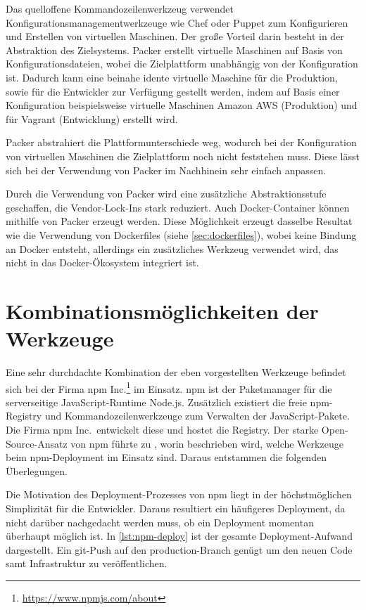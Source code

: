 Das quelloffene Kommandozeilenwerkzeug verwendet Konfigurationsmanagementwerkzeuge wie Chef oder Puppet zum Konfigurieren und Erstellen von virtuellen Maschinen.
Der große Vorteil darin besteht in der Abstraktion des Zielsystems.
Packer erstellt virtuelle Maschinen auf Basis von Konfigurationsdateien, wobei die Zielplattform unabhängig von der Konfiguration ist.
Dadurch kann eine beinahe idente virtuelle Maschine für die Produktion, sowie für die Entwickler zur Verfügung gestellt werden, indem auf Basis einer Konfiguration beispielsweise virtuelle Maschinen Amazon AWS (Produktion) und für Vagrant (Entwicklung) erstellt wird.

Packer abstrahiert die Plattformunterschiede weg, wodurch bei der Konfiguration von virtuellen Maschinen die Zielplattform noch nicht feststehen muss.
Diese lässt sich bei der Verwendung von Packer im Nachhinein sehr einfach anpassen.

Durch die Verwendung von Packer wird eine zusätzliche Abstraktionsstufe geschaffen, die Vendor-Lock-Ins stark reduziert.
Auch Docker-Container können mithilfe von Packer erzeugt werden.
Diese Möglichkeit erzeugt dasselbe Resultat wie die Verwendung von Dockerfiles (siehe \cref{sec:dockerfiles}), wobei keine Bindung an Docker entsteht, allerdings ein zusätzliches Werkzeug verwendet wird, das nicht in das Docker-Ökosystem integriert ist.


\section{Kombinationsmöglichkeiten der Werkzeuge}
\label{sec:werkzeugkombinationsmoeglichkeiten}
Eine sehr durchdachte Kombination der eben vorgestellten Werkzeuge befindet sich bei der Firma npm Inc.\footnote{\url{https://www.npmjs.com/about}} im Einsatz.
npm ist der Paketmanager für die serverseitige JavaScript-Runtime Node.js.
Zusätzlich existiert die freie npm-Registry und Kommandozeilenwerkzeuge zum Verwalten der JavaScript-Pakete.
Die Firma npm Inc.\ entwickelt diese und hostet die Registry.
Der starke Open-Source-Ansatz von npm führte zu \autocite{npm-deployment:online}, worin beschrieben wird, welche Werkzeuge beim npm-Deployment im Einsatz sind. Daraus entstammen die folgenden Überlegungen.


Die Motivation des Deployment-Prozesses von npm liegt in der höchstmöglichen Simplizität für die Entwickler.
Daraus resultiert ein häufigeres Deployment, da nicht darüber nachgedacht werden muss, ob ein Deployment momentan überhaupt möglich ist.
In \cref{lst:npm-deploy} ist der gesamte Deployment-Aufwand dargestellt.
Ein git-Push auf den production-Branch genügt um den neuen Code samt Infrastruktur zu veröffentlichen.

